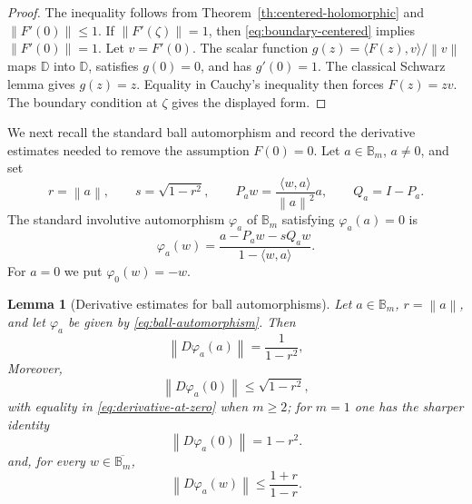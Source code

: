 \documentclass[11pt]{amsart}
\newtheorem{lemma}[theorem]{Lemma}
\theoremstyle{definition}
\theoremstyle{remark}
\newcommand{\D}{\mathbb D}
\newcommand{\B}{\mathbb B}
\newcommand{\inner}[2]{\langle #1,#2\rangle}
\newcommand{\norm}[1]{\left\|#1\right\|}
\begin{document}
\begin{proof}
The inequality follows from Theorem~\ref{th:centered-holomorphic} and \(\norm{F'(0)}\le1\). If \(\norm{F'(\zeta)}=1\), then \eqref{eq:boundary-centered} implies \(\norm{F'(0)}=1\). Let \(v=F'(0)\). The scalar function \(g(z)=\inner{F(z)}{v}/\norm{v}\) maps \(\D\) into \(\D\), satisfies \(g(0)=0\), and has \(g'(0)=1\). The classical Schwarz lemma gives \(g(z)=z\). Equality in Cauchy's inequality then forces \(F(z)=zv\). The boundary condition at \(\zeta\) gives the displayed form.
\end{proof}

We next recall the standard ball automorphism and record the derivative estimates needed to remove the assumption \(F(0)=0\). Let \(a\in\B_m\), \(a\ne0\), and set
\[
        r=\norm{a},
        \qquad
        s=\sqrt{1-r^2},
        \qquad
        P_a w=\frac{\inner{w}{a}}{\norm{a}^2}a,
        \qquad
        Q_a=I-P_a.
\]
The standard involutive automorphism \(\varphi_a\) of \(\B_m\) satisfying \(\varphi_a(a)=0\) is
\begin{equation}\label{eq:ball-automorphism}
        \varphi_a(w)=\frac{a-P_aw-sQ_aw}{1-\inner{w}{a}}.
\end{equation}
For \(a=0\) we put \(\varphi_0(w)=-w\).

\begin{lemma}[Derivative estimates for ball automorphisms]\label{lem:automorphism-derivatives}
Let \(a\in\B_m\), \(r=\norm{a}\), and let \(\varphi_a\) be given by \eqref{eq:ball-automorphism}. Then
\begin{equation}\label{eq:derivative-at-a}
        \norm{D\varphi_a(a)}=\frac{1}{1-r^2},
\end{equation}
Moreover,
\begin{equation}\label{eq:derivative-at-zero}
        \norm{D\varphi_a(0)}\le\sqrt{1-r^2},
\end{equation}
with equality in \eqref{eq:derivative-at-zero} when \(m\ge2\); for \(m=1\) one has the sharper identity
\[
        \norm{D\varphi_a(0)}=1-r^2.
\]
and, for every \(w\in\overline{\B_m}\),
\begin{equation}\label{eq:global-derivative-bound}
        \norm{D\varphi_a(w)}\le \frac{1+r}{1-r}.
\end{equation}
\end{lemma}
\end{document}
